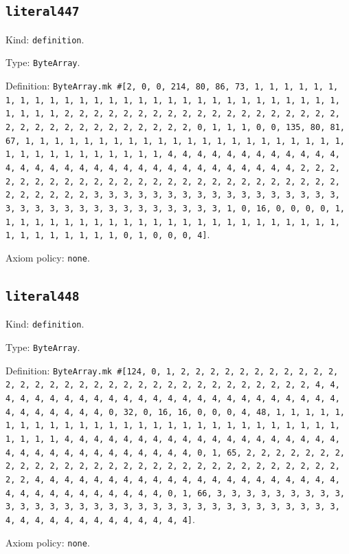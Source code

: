 \documentclass[11pt]{article}
\begin{document}
\subsection*{\texttt{literal447}}
\noindent Kind: \texttt{definition}.\par
\noindent Type: \texttt{ByteArray}.\par
\noindent Definition: \texttt{ByteArray.mk \#[2, 0, 0, 214, 80, 86, 73, 1, 1, 1, 1, 1, 1, 1, 1, 1, 1, 1, 1, 1, 1, 1, 1, 1, 1, 1, 1, 1, 1, 1, 1, 1, 1, 1, 1, 1, 1, 1, 1, 1, 2, 2, 2, 2, 2, 2, 2, 2, 2, 2, 2, 2, 2, 2, 2, 2, 2, 2, 2, 2, 2, 2, 2, 2, 2, 2, 2, 2, 2, 2, 2, 2, 0, 1, 1, 1, 0, 0, 135, 80, 81, 67, 1, 1, 1, 1, 1, 1, 1, 1, 1, 1, 1, 1, 1, 1, 1, 1, 1, 1, 1, 1, 1, 1, 1, 1, 1, 1, 1, 1, 1, 1, 1, 1, 1, 4, 4, 4, 4, 4, 4, 4, 4, 4, 4, 4, 4, 4, 4, 4, 4, 4, 4, 4, 4, 4, 4, 4, 4, 4, 4, 4, 4, 4, 4, 4, 4, 2, 2, 2, 2, 2, 2, 2, 2, 2, 2, 2, 2, 2, 2, 2, 2, 2, 2, 2, 2, 2, 2, 2, 2, 2, 2, 2, 2, 2, 2, 2, 2, 3, 3, 3, 3, 3, 3, 3, 3, 3, 3, 3, 3, 3, 3, 3, 3, 3, 3, 3, 3, 3, 3, 3, 3, 3, 3, 3, 3, 3, 3, 3, 3, 1, 0, 16, 0, 0, 0, 0, 1, 1, 1, 1, 1, 1, 1, 1, 1, 1, 1, 1, 1, 1, 1, 1, 1, 1, 1, 1, 1, 1, 1, 1, 1, 1, 1, 1, 1, 1, 1, 1, 0, 1, 0, 0, 0, 4]}.\par
\noindent Axiom policy: \texttt{none}.\par
\subsection*{\texttt{literal448}}
\noindent Kind: \texttt{definition}.\par
\noindent Type: \texttt{ByteArray}.\par
\noindent Definition: \texttt{ByteArray.mk \#[124, 0, 1, 2, 2, 2, 2, 2, 2, 2, 2, 2, 2, 2, 2, 2, 2, 2, 2, 2, 2, 2, 2, 2, 2, 2, 2, 2, 2, 2, 2, 2, 2, 2, 2, 4, 4, 4, 4, 4, 4, 4, 4, 4, 4, 4, 4, 4, 4, 4, 4, 4, 4, 4, 4, 4, 4, 4, 4, 4, 4, 4, 4, 4, 4, 4, 4, 0, 32, 0, 16, 16, 0, 0, 0, 4, 48, 1, 1, 1, 1, 1, 1, 1, 1, 1, 1, 1, 1, 1, 1, 1, 1, 1, 1, 1, 1, 1, 1, 1, 1, 1, 1, 1, 1, 1, 1, 1, 1, 4, 4, 4, 4, 4, 4, 4, 4, 4, 4, 4, 4, 4, 4, 4, 4, 4, 4, 4, 4, 4, 4, 4, 4, 4, 4, 4, 4, 4, 4, 4, 4, 0, 1, 65, 2, 2, 2, 2, 2, 2, 2, 2, 2, 2, 2, 2, 2, 2, 2, 2, 2, 2, 2, 2, 2, 2, 2, 2, 2, 2, 2, 2, 2, 2, 2, 2, 4, 4, 4, 4, 4, 4, 4, 4, 4, 4, 4, 4, 4, 4, 4, 4, 4, 4, 4, 4, 4, 4, 4, 4, 4, 4, 4, 4, 4, 4, 4, 4, 0, 1, 66, 3, 3, 3, 3, 3, 3, 3, 3, 3, 3, 3, 3, 3, 3, 3, 3, 3, 3, 3, 3, 3, 3, 3, 3, 3, 3, 3, 3, 3, 3, 3, 3, 4, 4, 4, 4, 4, 4, 4, 4, 4, 4, 4, 4, 4]}.\par
\noindent Axiom policy: \texttt{none}.\par
\end{document}

